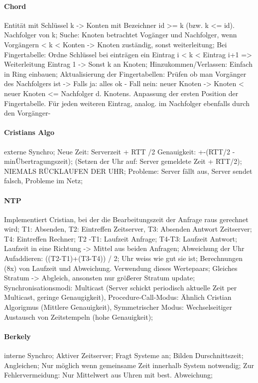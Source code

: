 \documentclass[pagesize,11pt,a4paper]{scrartcl}
\begin{document}
\paragraph*{Chord}
	Entität mit Schlüssel k -> Konten mit Bezeichner id >= k (bzw. k <= id). Nachfolger von k;
	Suche: Knoten betrachtet Vogänger und Nachfolger, wenn Vorgängern < k < Konten -> Knoten zuständig, sonst weiterleitung;
	Bei Fingertabelle: Ordne Schlüssel bei einträgen ein Eintrag i < k < Eintrag i+1 => Weiterleitung Eintrag 1 -> Sonst k an Knoten;
	Hinzukommen/Verlassen: Einfach in Ring einbauen; Aktualisierung der Fingertabellen: Prüfen ob man Vorgänger des Nachfolgers ist ->
		Falls ja: alles ok -
		Fall nein: neuer Knoten -> Knoten < neuer Knoten <= Nachfolger d. Knotens. Anpassung der ersten Position der Fingertabelle. Für jeden weiteren Eintrag, analog. im Nachfolger ebenfalls durch den Vorgänger-

\paragraph*{Cristians Algo}
	externe Synchro;
	Neue Zeit: Serverzeit + RTT /2  Genauigkeit: +-(RTT/2 - minÜbertragungszeit);
	(Setzen der Uhr auf: Server gemeldete Zeit + RTT/2);
	NIEMALS RÜCKLAUFEN DER UHR;
	Probleme: Server fällt aus, Server sendet falsch, Probleme im Netz;

\paragraph*{NTP}
	Implementiert Cristian, bei der die Bearbeitungszeit der Anfrage raus gerechnet wird;
	T1: Absenden, T2: Eintreffen Zeitserver, T3: Absenden Antwort Zeitserver; T4: Eintreffen Rechner;
	T2 -T1: Laufzeit Anfrage; T4-T3: Laufzeit Antwort;
	Laufzeit in eine Richtung -> Mittel aus beiden Anfragen;
	Abweichung der Uhr Aufaddieren: ((T2-T1)+(T3-T4)) / 2;
	Uhr weiss wie gut sie ist;
	Berechnungen (8x) von Laufzeit und Abweichung. Verwendung dieses Wertepaars;
	Gleiches Stratum -> Abgleich, ansonsten nur größerer Stratum update;
	Synchronisationsmodi: Multicast (Server schickt periodisch aktuelle Zeit per Multicast, geringe Genaugigkeit), Procedure-Call-Modus: Ähnlich Cristian Algorigmus (Mittlere Genauigkeit), Symmetrischer Modus: Wechselseitiger Austausch von Zeitstempeln (hohe Genauigkeit); 

\paragraph*{Berkely}
	interne Synchro;
	Aktiver Zeitserver; Fragt Systeme an; Bilden Durschnittszeit; Angleichen;
	Nur möglich wenn gemeinsame Zeit innerhalb System notwendig;
	Zur Fehlervermeidung: Nur Mittelwert aus Uhren mit best. Abweichung;
\end{document}

